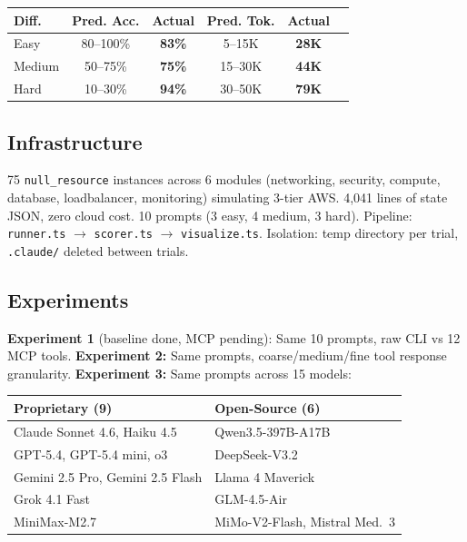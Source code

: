\documentclass[10pt,twocolumn]{article}
\begin{document}
\begin{table}[h]
\centering\small
\begin{tabular}{lccccc}
\toprule
\textbf{Diff.} & \textbf{Pred. Acc.} & \textbf{Actual} & \textbf{Pred. Tok.} & \textbf{Actual} \\
\midrule
Easy & 80--100\% & \textbf{83\%} & 5--15K & \textbf{28K} \\
Medium & 50--75\% & \textbf{75\%} & 15--30K & \textbf{44K} \\
Hard & 10--30\% & \textbf{94\%} & 30--50K & \textbf{79K} \\
\bottomrule
\end{tabular}
\end{table}

\subsection{Infrastructure}

75 \texttt{null\_resource} instances across 6 modules (networking, security, compute, database, loadbalancer, monitoring) simulating 3-tier AWS. 4,041 lines of state JSON, zero cloud cost. 10 prompts (3 easy, 4 medium, 3 hard). Pipeline: \texttt{runner.ts} $\to$ \texttt{scorer.ts} $\to$ \texttt{visualize.ts}. Isolation: temp directory per trial, \texttt{.claude/} deleted between trials.

\subsection{Experiments}

\textbf{Experiment 1} (baseline done, MCP pending): Same 10 prompts, raw CLI vs 12 MCP tools.
\textbf{Experiment 2:} Same prompts, coarse/medium/fine tool response granularity.
\textbf{Experiment 3:} Same prompts across 15 models:

\begin{table}[h]
\centering\small
\begin{tabularx}{\columnwidth}{lX}
\toprule
\textbf{Proprietary (9)} & \textbf{Open-Source (6)} \\
\midrule
Claude Sonnet 4.6, Haiku 4.5 & Qwen3.5-397B-A17B \\
GPT-5.4, GPT-5.4 mini, o3 & DeepSeek-V3.2 \\
Gemini 2.5 Pro, Gemini 2.5 Flash & Llama 4 Maverick \\
Grok 4.1 Fast & GLM-4.5-Air \\
MiniMax-M2.7 & MiMo-V2-Flash, Mistral Med.\ 3 \\
\bottomrule
\end{tabularx}
\end{table}
\end{document}
